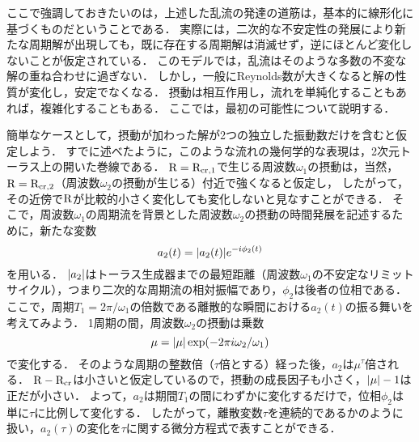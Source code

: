 ここで強調しておきたいのは，上述した乱流の発達の道筋は，基本的に線形化に基づくものだということである．
実際には，二次的な不安定性の発展により新たな周期解が出現しても，既に存在する周期解は消滅せず，逆にほとんど変化しないことが仮定されている．
このモデルでは，乱流はそのような多数の不変な解の重ね合わせに過ぎない．
しかし，一般にReynolds数が大きくなると解の性質が変化し，安定でなくなる．
摂動は相互作用し，流れを単純化することもあれば，複雑化することもある．
ここでは，最初の可能性について説明する．




簡単なケースとして，摂動が加わった解が2つの独立した振動数だけを含むと仮定しよう．
すでに述べたように，このような流れの幾何学的な表現は，2次元トーラス上の開いた巻線である．
$\mathrm{R}=\mathrm{R}_\mathrm{cr,1}$で生じる周波数$\omega_1$の摂動は，当然，$\mathrm{R}=\mathrm{R}_\mathrm{cr,2}$（周波数$\omega_2$の摂動が生じる）付近で強くなると仮定し，
したがって，その近傍で$\mathrm{R}$が比較的小さく変化しても変化しないと見なすことができる．
そこで，周波数$\omega_1$の周期流を背景とした周波数$\omega_2$の摂動の時間発展を記述するために，新たな変数 
\begin{equation}
    a_2(t) = \abs{a_2(t)}e^{-i\phi_2(t)}
\end{equation}
を用いる．
$\abs{a_2}$はトーラス生成器までの最短距離（周波数$\omega_1$の不安定なリミットサイクル），つまり二次的な周期流の相対振幅であり，$\phi_2$は後者の位相である．
ここで，周期$T_1=2\pi/\omega_1$の倍数である離散的な瞬間における$a_2(t)$の振る舞いを考えてみよう．
1周期の間，周波数$\omega_2$の摂動は乗数
\[
    \mu = \abs{\mu} \exp(-2\pi i\omega_2/\omega_1)
\]
で変化する．
そのような周期の整数倍（$\tau$倍とする）経った後，$a_2$は$\mu^\tau$倍される．
$\mathrm{R}-\mathrm{R}_{\mathrm{cr}}$は小さいと仮定しているので，摂動の成長因子も小さく，$\abs{\mu}-1$は正だが小さい．
よって，$a_2$は期間$T_1$の間にわずかに変化するだけで，位相$\phi_2$は単に$\tau$に比例して変化する．
したがって，離散変数$\tau$を連続的であるかのように扱い，$a_2(\tau)$の変化を$\tau$に関する微分方程式で表すことができる．


